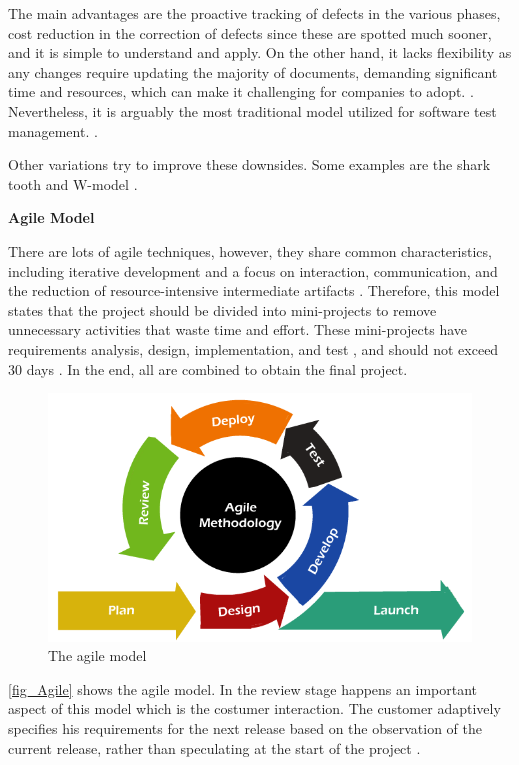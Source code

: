 The main advantages are the proactive tracking of defects in the various phases, cost reduction in the correction of defects since these are spotted much sooner, and it is simple to understand and apply. On the other hand, it lacks flexibility as any changes require updating the majority of documents, demanding significant time and resources, which can make it challenging for companies to adopt. \cite{V-model} \cite{V-model2}. Nevertheless, it is arguably the most traditional model utilized for software test management. \cite{mathur2010advancements}.

Other variations try to improve these downsides. Some examples are the shark tooth and W-model \cite{V-model2}.
\newline

\textbf{Agile Model}
\newline

There are lots of agile techniques, however, they share common characteristics, including iterative development and a focus on interaction, communication, and the reduction of resource-intensive intermediate artifacts \cite{waterfallAndAgile}. Therefore, this model states that the project should be divided into mini-projects to remove unnecessary activities that waste time and effort. These mini-projects have requirements analysis, design, implementation, and test \cite{waterfallAndAgile}, and should not exceed 30 days \cite{AgileModel}. In the end, all are combined to obtain the final project.

\begin{figure}[H]
	\centering
 	\includegraphics[width=0.5\linewidth]{Images/agileModel.png}
 	\caption{The agile model}
	 \label{fig_Agile}
\end{figure}

\autoref{fig_Agile} shows the agile model. In the review stage happens an important aspect of this model which is the costumer interaction. The customer adaptively specifies his requirements for the next release based on the observation of the current release, rather than speculating at the start of the project \cite{SpiralModel}. 
\newline

